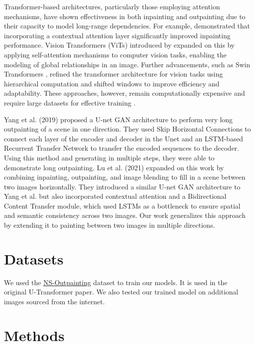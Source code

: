 \documentclass[sigconf]{acmart}
\begin{document}
Transformer-based architectures, particularly those employing attention mechanisms, have shown effectiveness in both inpainting and outpainting due to their capacity to model long-range dependencies. For example, \cite{Jiahui2018} demonstrated that incorporating a contextual attention layer significantly improved inpainting performance. Vision Transformers (ViTs) introduced by \cite{Dosovitskiy2020} expanded on this by applying self-attention mechanisms to computer vision tasks, enabling the modeling of global relationships in an image. Further advancements, such as Swin Transformers \cite{Liu2021}, refined the transformer architecture for vision tasks using hierarchical computation and shifted windows to improve efficiency and adaptability. These approaches, however, remain computationally expensive and require large datasets for effective training \cite{Dascoli2021}.

Yang et al. (2019) proposed a U-net GAN architecture to perform very long outpainting of a scene in one direction. They used Skip Horizontal Connections to connect each layer of the encoder and decoder in the Unet and an LSTM-based Recurrent Transfer Network to transfer the encoded sequences to the decoder. Using this method and generating in multiple steps, they were able to demonstrate long outpainting. Lu et al. (2021) expanded on this work by combining inpainting, outpainting, and image blending to fill in a scene between two images horizontally. They introduced a similar U-net GAN architecture to Yang et al. but also incorporated contextual attention and a Bidirectional Content Transfer module, which used LSTMs as a bottleneck to ensure spatial and semantic consistency across two images. Our work generalizes this approach by extending it to painting between two images in multiple directions.

\section*{Datasets}
We used the \textcolor{red}{\href{https://github.com/z-x-yang/NS-Outpainting}{NS-Outpainting}} dataset to train our models. It is used in the original U-Transformer paper. We also tested our trained model on additional images sourced from the internet.

\section*{Methods}
\end{document}
